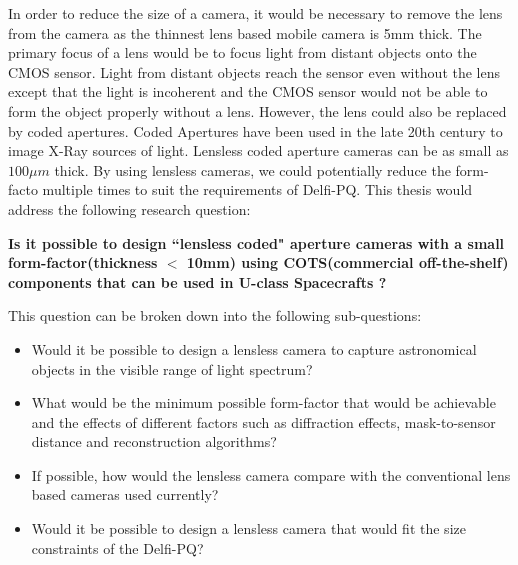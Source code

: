 In order to reduce the size of a camera, it would be necessary to remove the lens from the camera as the thinnest lens based mobile camera is 5mm thick. The primary focus of a lens would be to focus light from distant objects onto the CMOS sensor. Light from distant objects reach the sensor even without the lens except that the light is incoherent and the CMOS sensor would not be able to form the object properly without a lens. However, the lens could also be replaced by coded apertures. Coded Apertures have been used in the late 20th century to image X-Ray sources of light. Lensless coded aperture cameras can be as small as $100 \mu m$ thick. By using lensless cameras, we could potentially reduce the form-facto multiple times to suit the requirements of Delfi-PQ. This thesis would address the following research question:


\textbf{Is it possible to design ``lensless coded" aperture cameras with a small form-factor(thickness $<$ 10mm) using COTS(commercial off-the-shelf) components that can be used in U-class Spacecrafts ?}

This question can be broken down into the following sub-questions:
\begin{itemize}
\item Would it be possible to design a lensless camera to capture astronomical objects in the visible range of light spectrum?
\item What would be the minimum possible form-factor that would be achievable and the effects of different factors such as diffraction effects, mask-to-sensor distance and reconstruction algorithms?
\item If possible, how would the lensless camera compare with the conventional lens based cameras used currently?
\item Would it be possible to design a lensless camera that would fit the size constraints of the Delfi-PQ?
\end{itemize}
\vspace{1\baselineskip}

\noindent


